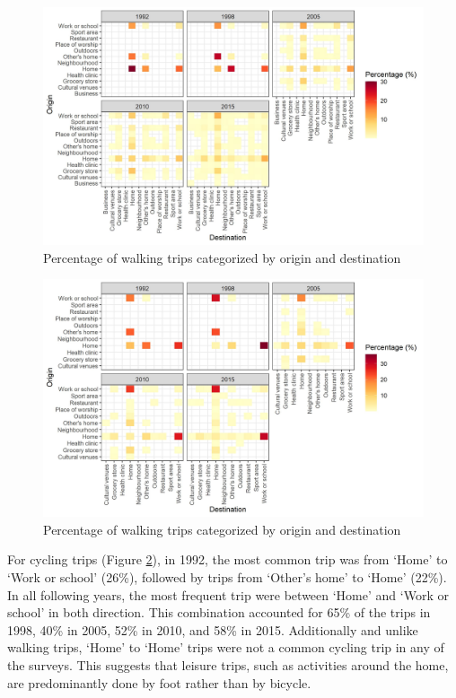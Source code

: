 \documentclass[preprint, 3p,
authoryear]{elsarticle} %
\begin{document}
\begin{figure}
\includegraphics[width=1\linewidth]{figures/walking_hm_fig} \caption{Percentage of walking trips categorized by origin and destination}\label{fig:walking-heatmap}
\end{figure}

\begin{figure}
\includegraphics[width=1\linewidth]{figures/cycling_hm_fig} \caption{Percentage of walking trips categorized by origin and destination}\label{fig:cycling-heatmap}
\end{figure}

For cycling trips (Figure \ref{fig:cycling-heatmap}), in 1992, the most
common trip was from `Home' to `Work or school' (26\%), followed by
trips from `Other's home' to `Home' (22\%). In all following years, the
most frequent trip were between `Home' and `Work or school' in both
direction. This combination accounted for 65\% of the trips in 1998,
40\% in 2005, 52\% in 2010, and 58\% in 2015. Additionally and unlike
walking trips, `Home' to `Home' trips were not a common cycling trip in
any of the surveys. This suggests that leisure trips, such as activities
around the home, are predominantly done by foot rather than by bicycle.
\end{document}
